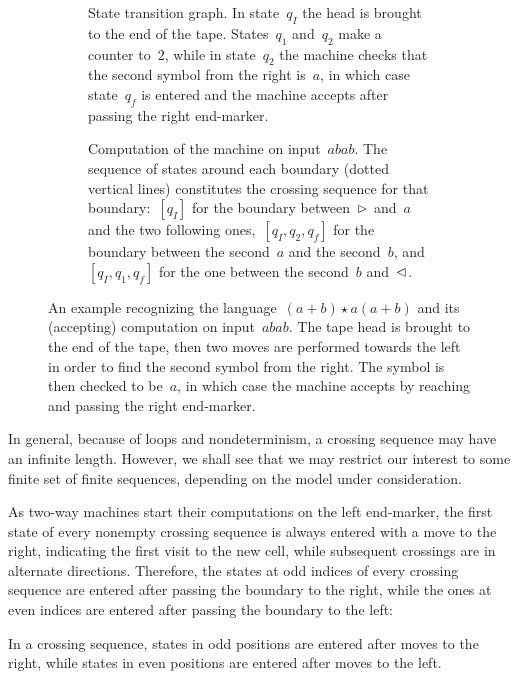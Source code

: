 \begin{figure}
	\centering
	\begin{subfigure}[b]{0.49\textwidth}
		\centering
		
		\caption{State transition graph.
			In state~$q_I$ the head is brought to the end of the tape. States~$q_1$ and~$q_2$ make a counter to~$2$, while in state~$q_2$ the machine checks that the second symbol from the right is~$a$, in which case state~$q_f$ is entered and the machine accepts after passing the right end-marker.\newline}
	\end{subfigure}
	\hfill
	\begin{subfigure}[b]{0.49\textwidth}
		\centering
		
		\caption{Computation of the machine on input~$abab$.
			The sequence of states around each boundary (dotted vertical lines) constitutes the crossing sequence for that boundary:~$[q_I]$ for the boundary between~$\rhd$ and~$a$ and the two following ones,~$[q_I,q_2,q_f]$ for the boundary between the second~$a$ and the second~$b$, and~$[q_I,q_1,q_f]$ for the one between the second~$b$ and~$\lhd$.}
		\label{sfig:example-crosseq-2}
	\end{subfigure}

	\caption[Example \TDFA and the crossing sequences generated by its computation on a given input.]{An example \TDFA recognizing the language~$(a+b)\star a(a+b)$ and its (accepting) computation on input~$abab$.
		The tape head is brought to the end of the tape, then two moves are performed towards the left in order to find the second symbol from the right. The symbol is then checked to be~$a$, in which case the machine accepts by reaching and passing the right end-marker.}
	\label{fig:example-crosseq}
\end{figure}

In general, because of loops and nondeterminism, a crossing sequence may have an infinite length.
However, we shall see that we may restrict our interest to some finite set of finite sequences, depending on the model under consideration.

As two-way machines start their computations on the left end-marker, the first state of every nonempty crossing sequence is always entered with a move to the right, indicating the first visit to the new cell, while subsequent crossings are in alternate directions.
Therefore, the states at odd indices of every crossing sequence are entered after passing the boundary to the right, while the ones at even indices are entered after passing the boundary to the left:
\begin{fact}\label{fact:crossing-parity}
	In a crossing sequence, states in odd positions are entered after moves to the right, while states in even positions are entered after moves to the left.
\end{fact}

